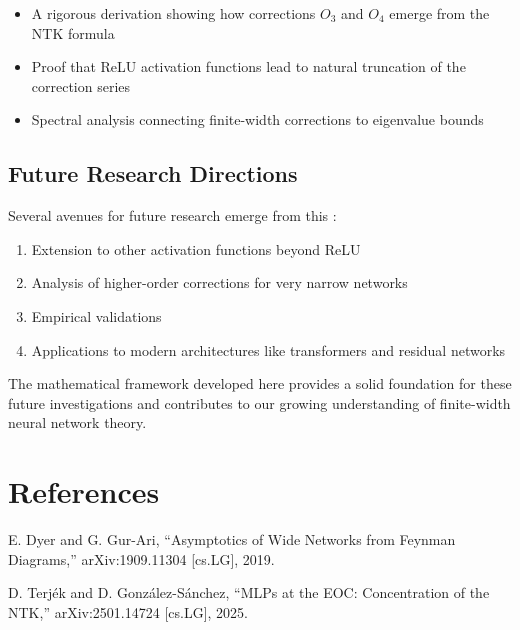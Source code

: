 \documentclass[11pt,a4paper]{article}
\theoremstyle{definition}
\begin{document}
\begin{itemize}
\item A rigorous derivation showing how corrections $O_3$ and $O_4$ emerge from the NTK formula
\item Proof that ReLU activation functions lead to natural truncation of the correction series
\item Spectral analysis connecting finite-width corrections to eigenvalue bounds
\end{itemize}

\subsection{Future Research Directions}

Several avenues for future research emerge from this :

\begin{enumerate}
\item Extension to other activation functions beyond ReLU
\item Analysis of higher-order corrections for very narrow networks
\item Empirical validations
\item Applications to modern architectures like transformers and residual networks
\end{enumerate}

The mathematical framework developed here provides a solid foundation for these future investigations and contributes to our growing understanding of finite-width neural network theory.

\newpage




\appendix
\section{References}

E. Dyer and G. Gur-Ari,
``Asymptotics of Wide Networks from Feynman Diagrams,''
arXiv:1909.11304 [cs.LG], 2019.

D. Terjék and D. González-Sánchez,
``MLPs at the EOC: Concentration of the NTK,''
arXiv:2501.14724 [cs.LG], 2025.
\end{document}
